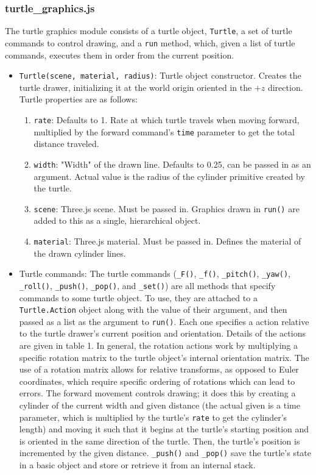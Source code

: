 \documentclass{article}
\newcommand{\tab}{\hspace*{2em}}
\begin{document}
            \subsubsection{turtle\_graphics.js}
    \tab The turtle graphics module consists of a turtle object, \verb|Turtle|, a set of turtle
commands to control drawing, and a \verb|run| method, which, given a list of turtle commands,
executes them in order from the current position.
\begin{itemize}
    \item \verb|Turtle(scene, material, radius)|: Turtle object constructor. Creates the turtle
drawer, initializing it at the world origin oriented in the $+z$ direction. Turtle properties
are as follows:
    \begin{enumerate}
        \item \verb|rate|: Defaults to 1. Rate at which turtle travels when moving forward,
    multiplied by the forward command's \verb|time| parameter to get the total distance traveled.
        \item \verb|width|: "Width" of the drawn line. Defaults to 0.25, can be passed in as an
    argument. Actual value is the radius of the cylinder primitive created by the turtle.
        \item \verb|scene|: Three.js scene. Must be passed in. Graphics drawn in \verb|run()| are
    added to this as a single, hierarchical object.
        \item \verb|material|: Three.js material. Must be passed in. Defines the material of the
    drawn cylinder lines.
    \end{enumerate}

    \item Turtle commands: The turtle commands (\verb|_F()|, \verb|_f()|, \verb|_pitch()|,
\verb|_yaw()|, \verb|_roll()|, \verb|_push()|, \verb|_pop()|, and \verb|_set()|) are all methods
that specify commands to some turtle object. To use, they are attached to a \verb|Turtle.Action|
object along with the value of their argument, and then passed as a list as the argument to
\verb|run()|. Each one specifies a action relative to the turtle drawer's current position and
orientation. Details of the actions are given in table 1. In general, the rotation actions work by
multiplying a specific rotation matrix to the turtle object's internal orientation matrix. The use
of a rotation matrix allows for relative transforms, as opposed to Euler coordinates, which require
specific ordering of rotations which can lead to errors. The forward movement controls drawing; it
does this by creating a cylinder of the current width and given distance (the actual given is a
time parameter, which is multiplied by the turtle's \verb|rate| to get the cylinder's length) and
moving it such that it begins at the turtle's starting position and is oriented in the same
direction of the turtle. Then, the turtle's position is incremented by the given distance.
\verb|_push()| and \verb|_pop()| save the turtle's state in a basic object and store or retrieve it
from an internal stack.


\end{itemize}
\end{document}
